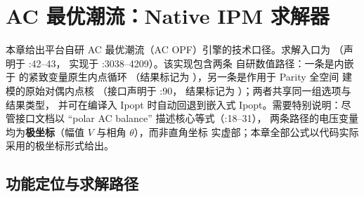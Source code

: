 \section{AC 最优潮流：Native IPM 求解器}\label{sec:acopfnative}

本章给出平台自研 AC 最优潮流（AC OPF）引擎的技术口径。求解入口为
\allowbreak{}\allowbreak （声明于
:42--43，
实现于 :3038--4209）。该实现包含两条
自研数值路径：一条是内嵌于  的紧致变量原生内点循环
（结果标记为 ），另一条是作用于 Parity 全空间
建模的原始对偶内点核 \allowbreak （接口声明于
:90，
结果标记为 ）；两者共享同一组选项与结果类型，
并可在编译入 Ipopt 时自动回退到嵌入式 Ipopt。需要特别说明：尽管接口文档以
``polar AC balance'' 描述核心等式（:18--31），
两条路径的电压变量均为\textbf{极坐标}（幅值 $V$ 与相角 $\theta$），而非直角坐标
实虚部；本章全部公式以代码实际采用的极坐标形式给出。

\subsection{功能定位与求解路径}\label{subsec:acopfnative:role}

